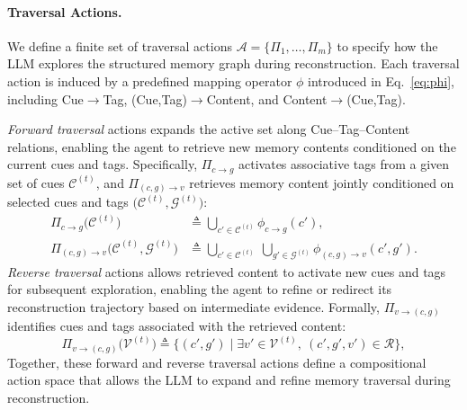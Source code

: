 \documentclass{llmxive}
\begin{document}
\paragraph{Traversal Actions.}
We define a finite set of traversal actions
$\mathcal{A}=\{\Pi_1,\ldots,\Pi_m\}$ to specify how the LLM explores the structured
memory graph during reconstruction.
Each traversal action is induced by a predefined mapping operator $\phi$
introduced in Eq.~\eqref{eq:phi}, including
Cue$\rightarrow$Tag, (Cue,Tag)$\rightarrow$Content, and Content$\rightarrow$(Cue,Tag).

\emph{Forward traversal} actions expands the active set along Cue--Tag--Content relations, enabling the agent to retrieve new memory contents conditioned on the current cues and tags. Specifically, $\Pi_{c\rightarrow g}$ activates associative tags from a given set
of cues $\mathcal{C}^{(t)}$, and $\Pi_{(c,g)\rightarrow v}$ retrieves memory
content jointly conditioned on selected cues and tags
$\big(\mathcal{C}^{(t)}, \mathcal{G}^{(t)}\big)$:
\begin{equation}
\label{eq:traversal-actions}
\begin{aligned}
\Pi_{c\rightarrow g}\!\big(\mathcal{C}^{(t)}\big)
&\triangleq
\bigcup_{c'\in \mathcal{C}^{(t)}} \phi_{c\rightarrow g}(c'), \\
\Pi_{(c,g)\rightarrow v}\!\big(\mathcal{C}^{(t)}, \mathcal{G}^{(t)}\big)
&\triangleq
\bigcup_{c'\in \mathcal{C}^{(t)}}\ \bigcup_{g'\in \mathcal{G}^{(t)}} \phi_{(c,g)\rightarrow v}(c',g').
\end{aligned}
\end{equation}
\emph{Reverse traversal} actions allows retrieved content to activate new cues and tags for subsequent exploration, enabling the agent to refine or redirect its
reconstruction trajectory based on intermediate evidence.
Formally, $\Pi_{v\rightarrow (c,g)}$ identifies cues and tags associated with the retrieved content:
\begin{equation}
\Pi_{v\rightarrow (c,g)}\!\big(\mathcal{V}^{(t)}\big)
\triangleq
\{(c',g')
\mid
\exists v'\in \mathcal{V}^{(t)},\ (c',g',v')\in \mathcal{R}\},
\end{equation}
Together, these forward and reverse traversal actions define a compositional action space that allows the LLM to expand and refine memory traversal during reconstruction.
\end{document}
